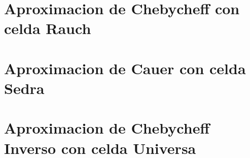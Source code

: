 







\tableofcontents
\newpage

\section{Aproximacion de Chebycheff con celda Rauch}
		
	
\section{Aproximacion de Cauer con celda Sedra}
		
	
\section{Aproximacion de Chebycheff Inverso con celda Universa}
		

